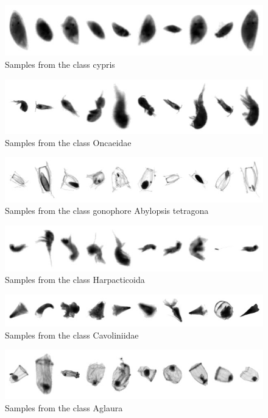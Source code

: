\begin{figure}[h]
\includegraphics[width=\columnwidth]{collage/077_cypris.jpg}\caption{Samples from the class cypris }
\end{figure}
\begin{figure}[h]
\includegraphics[width=\columnwidth]{collage/078_Oncaeidae.jpg}\caption{Samples from the class Oncaeidae }
\end{figure}
\begin{figure}[h]
\includegraphics[width=\columnwidth]{collage/079_gonophore__Abylopsis_tetragona.jpg}\caption{Samples from the class gonophore  Abylopsis tetragona }
\end{figure}
\begin{figure}[h]
\includegraphics[width=\columnwidth]{collage/080_Harpacticoida.jpg}\caption{Samples from the class Harpacticoida }
\end{figure}
\begin{figure}[h]
\includegraphics[width=\columnwidth]{collage/081_Cavoliniidae.jpg}\caption{Samples from the class Cavoliniidae }
\end{figure}
\begin{figure}[h]
\includegraphics[width=\columnwidth]{collage/082_Aglaura.jpg}\caption{Samples from the class Aglaura }
\end{figure}
